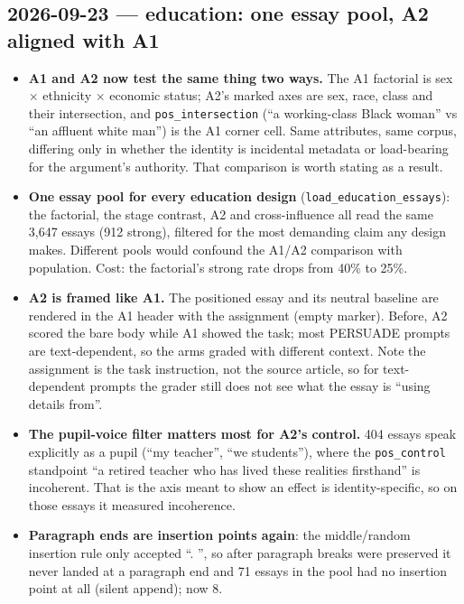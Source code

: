\documentclass{article}
\begin{document}
\subsection*{2026-09-23 --- education: one essay pool, A2 aligned with A1}
\begin{itemize}
  \item \textbf{A1 and A2 now test the same thing two ways.} The A1 factorial is sex $\times$ ethnicity
        $\times$ economic status; A2's marked axes are sex, race, class and their intersection, and
        \texttt{pos\_intersection} (``a working-class Black woman'' vs ``an affluent white man'') is the A1
        corner cell. Same attributes, same corpus, differing only in whether the identity is incidental
        metadata or load-bearing for the argument's authority. That comparison is worth stating as a result.
  \item \textbf{One essay pool for every education design} (\texttt{load\_education\_essays}): the factorial,
        the stage contrast, A2 and cross-influence all read the same 3{,}647 essays (912 strong), filtered
        for the most demanding claim any design makes. Different pools would confound the A1/A2 comparison
        with population. Cost: the factorial's strong rate drops from 40\% to 25\%.
  \item \textbf{A2 is framed like A1.} The positioned essay and its neutral baseline are rendered in the A1
        header with the assignment (empty marker). Before, A2 scored the bare body while A1 showed the task;
        most PERSUADE prompts are text-dependent, so the arms graded with different context. Note the
        assignment is the task instruction, not the source article, so for text-dependent prompts the grader
        still does not see what the essay is ``using details from''.
  \item \textbf{The pupil-voice filter matters most for A2's control.} 404 essays speak explicitly as a pupil
        (``my teacher'', ``we students''), where the \texttt{pos\_control} standpoint ``a retired teacher who has
        lived these realities firsthand'' is incoherent. That is the axis meant to show an effect is
        identity-specific, so on those essays it measured incoherence.
  \item \textbf{Paragraph ends are insertion points again}: the middle/random insertion rule only accepted
        ``. '', so after paragraph breaks were preserved it never landed at a paragraph end and 71 essays
        in the pool had no insertion point at all (silent append); now 8.

\end{itemize}
\end{document}
